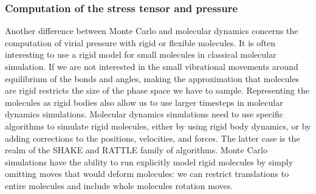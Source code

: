 \documentclass[thesis]{subfiles}
\begin{document}
\newpage
\subsubsection{Computation of the stress tensor and pressure}

Another difference between Monte Carlo and molecular dynamics concerns the
computation of virial pressure with rigid or flexible molecules. It is often
interesting to use a rigid model for small molecules in classical molecular
simulation. If we are not interested in the small vibrational movements around
equilibrium of the bonds and angles, making the approximation that molecules are
rigid restricts the size of the phase space we have to sample. Representing the
molecules as rigid bodies also allow us to use larger timesteps in molecular
dynamics simulations. Molecular dynamics simulations need to use specific
algorithms to simulate rigid molecules, either by using rigid body dynamics, or
by adding corrections to the positions, velocities, and forces. The latter case
is the realm of the SHAKE and RATTLE family of algorithms\cite{Ryckaert1977,
Andersen1983}. Monte Carlo simulations have the ability to run explicitly model
rigid molecules by simply omitting moves that would deform molecules: we can
restrict translations to entire molecules and include whole molecules rotation
moves.
\end{document}
